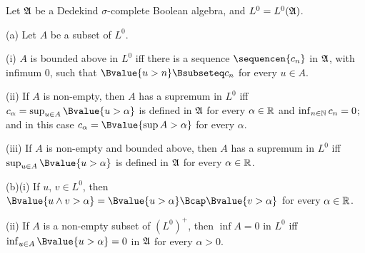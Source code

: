 Let $\frak A$ be a Dedekind $\sigma$-complete Boolean algebra, and
$L^0=L^0(\frak A)$.

(a) Let $A$ be a subset of $L^0$.

\quad(i) $A$ is bounded above in $L^0$ iff there is a sequence
$\sequencen{c_n}$ in $\frak A$, with infimum $0$, such that
$\Bvalue{u>n}\Bsubseteq c_n$ for every $u\in A$.

\quad(ii) If $A$ is non-empty, then $A$ has a supremum in $L^0$ iff
$c_{\alpha}=\sup_{u\in A}\Bvalue{u>\alpha}$ is defined in $\frak A$ for
every $\alpha\in\Bbb R$ and $\inf_{n\in\Bbb N}c_n=0$;  and in this case
$c_{\alpha}=\Bvalue{\sup A>\alpha}$ for every $\alpha$.

\quad(iii) If $A$ is non-empty and bounded above, then $A$ has a supremum in
$L^0$ iff $\sup_{u\in A}\Bvalue{u>\alpha}$ is defined in $\frak A$ for
every $\alpha\in\Bbb R$.

(b)(i) If $u$, $v\in L^0$, then
$\Bvalue{u\wedge v>\alpha}=\Bvalue{u>\alpha}\Bcap\Bvalue{v>\alpha}$ for
every $\alpha\in\Bbb R$.

\quad(ii) If $A$ is a non-empty subset of $(L^0)^+$,
then $\inf A=0$ in $L^0$ iff $\inf_{u\in A}\Bvalue{u>\alpha}=0$ in
$\frak A$ for every $\alpha>0$.

